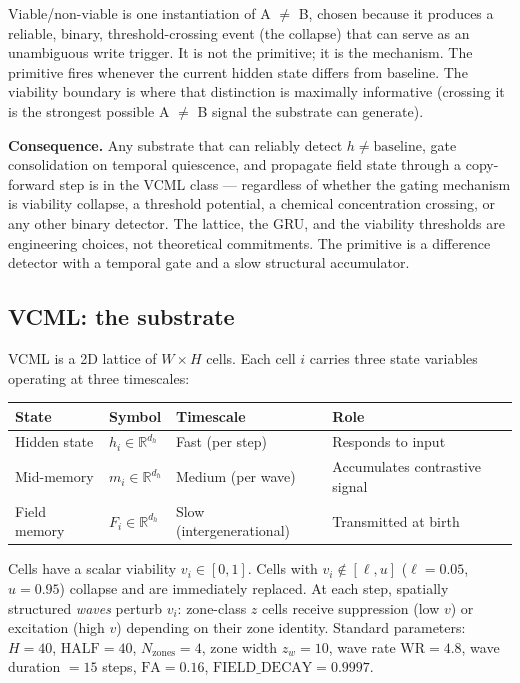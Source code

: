 \documentclass[11pt]{article}
\begin{document}
Viable/non-viable is one instantiation of A $\neq$ B, chosen because it produces
a reliable, binary, threshold-crossing event (the collapse) that can serve as an
unambiguous write trigger.
It is not the primitive; it is the mechanism.
The primitive fires whenever the current hidden state differs from baseline.
The viability boundary is where that distinction is maximally informative
(crossing it is the strongest possible A $\neq$ B signal the substrate can generate).

\textbf{Consequence.}
Any substrate that can reliably detect $h \neq \mathrm{baseline}$, gate consolidation
on temporal quiescence, and propagate field state through a copy-forward step is
in the VCML class --- regardless of whether the gating mechanism is viability collapse,
a threshold potential, a chemical concentration crossing, or any other binary detector.
The lattice, the GRU, and the viability thresholds are engineering choices, not theoretical commitments.
The primitive is a difference detector with a temporal gate and a slow structural accumulator.

\subsection{VCML: the substrate}

VCML is a 2D lattice of $W \times H$ cells.
Each cell $i$ carries three state variables operating at three timescales:

\begin{center}
\begin{tabular}{llll}
\toprule
State & Symbol & Timescale & Role \\
\midrule
Hidden state   & $h_i \in \mathbb{R}^{d_h}$ & Fast (per step)          & Responds to input \\
Mid-memory     & $m_i \in \mathbb{R}^{d_h}$ & Medium (per wave)        & Accumulates contrastive signal \\
Field memory   & $F_i \in \mathbb{R}^{d_h}$ & Slow (intergenerational) & Transmitted at birth \\
\bottomrule
\end{tabular}
\end{center}

Cells have a scalar viability $v_i \in [0,1]$.
Cells with $v_i \notin [\ell, u]$ ($\ell = 0.05$, $u = 0.95$) collapse and are
immediately replaced.
At each step, spatially structured \emph{waves} perturb $v_i$: zone-class $z$
cells receive suppression (low $v$) or excitation (high $v$) depending on
their zone identity.
Standard parameters: $H=40$, $\mathrm{HALF}=40$, $N_\mathrm{zones}=4$,
zone width $z_w=10$, wave rate $\mathrm{WR}=4.8$, wave duration $= 15$ steps,
$\mathrm{FA}=0.16$, $\mathrm{FIELD\_DECAY}=0.9997$.
\end{document}
